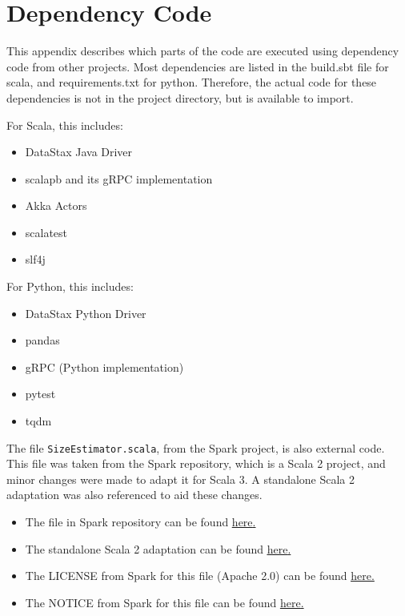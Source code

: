 \chapter{Dependency Code}

This appendix describes which parts of the code are executed using dependency code from other projects. Most dependencies are listed in the build.sbt file for scala, and requirements.txt for python. Therefore, the actual code for these dependencies is not in the project directory, but is available to import. 

For Scala, this includes:
\begin{itemize}
	\item DataStax Java Driver
	\item scalapb and its gRPC implementation 
	\item Akka Actors
	\item scalatest
	\item slf4j
\end{itemize}

For Python, this includes:
\begin{itemize}
	\item DataStax Python Driver
	\item pandas
	\item gRPC (Python implementation)
	\item pytest
	\item tqdm
\end{itemize}

The file \texttt{SizeEstimator.scala}, from the Spark project, is also external code. This file was taken from the Spark repository, which is a Scala 2 project, and minor changes were made to adapt it for Scala 3. A standalone Scala 2 adaptation was also referenced to aid these changes.

\begin{itemize}
	\item The file in Spark repository can be found \href{https://github.com/apache/spark/blob/master/core/src/main/scala/org/apache/spark/util/SizeEstimator.scala
	}{\underline{here}.}
	\item The standalone Scala 2 adaptation can be found \href{https://github.com/phatak-dev/java-sizeof/blob/master/src/main/scala/com/madhukaraphatak/sizeof/SizeEstimator.scala}{\underline{here}.}
	\item The LICENSE from Spark for this file (Apache 2.0) can be found \href{https://github.com/apache/spark/blob/master/LICENSE}{\underline{here}.}
	\item The NOTICE from Spark for this file can be found \href{https://github.com/apache/spark/blob/master/NOTICE}{\underline{here}.}
\end{itemize}
